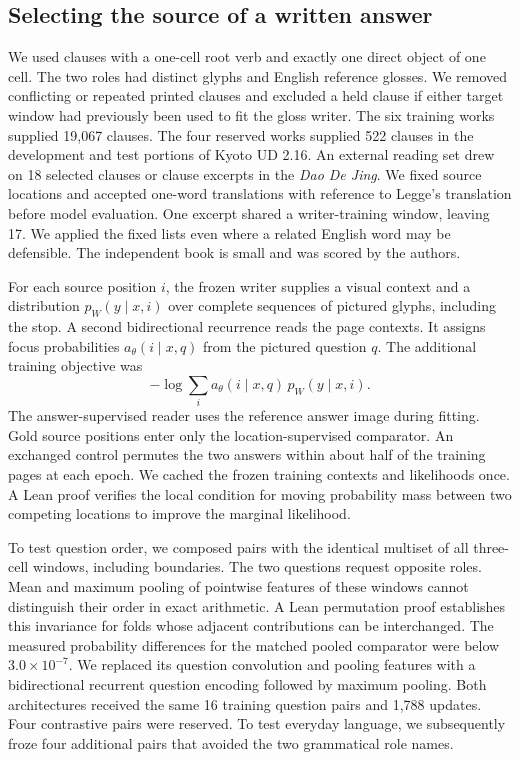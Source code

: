 \documentclass[12pt,a4paper]{article}
\providecommand{\DIFadd}[1]{{\protect\color{blue} \sf #1}} %
\begin{document}
\subsection*{\DIFadd{Selecting the source of a written answer}}
\DIFadd{We used clauses with a one-cell root verb and exactly one direct object of one cell. The two roles had distinct glyphs and English reference glosses. We removed conflicting or repeated printed clauses and excluded a held clause if either target window had previously been used to fit the gloss writer. The six training works supplied 19,067 clauses. The four reserved works supplied 522 clauses in the development and test portions of Kyoto UD 2.16. An external reading set drew on 18 selected clauses or clause excerpts in the \textit{Dao De Jing}. We fixed source locations and accepted one-word translations with reference to Legge's translation before model evaluation. One excerpt shared a writer-training window, leaving 17. We applied the fixed lists even where a related English word may be defensible. The independent book is small and was scored by the authors.
}

\DIFadd{For each source position $i$, the frozen writer supplies a visual context and a distribution $p_W(y\mid x,i)$ over complete sequences of pictured glyphs, including the stop. A second bidirectional recurrence reads the page contexts. It assigns focus probabilities $a_\theta(i\mid x,q)$ from the pictured question $q$. The additional training objective was
}\[
 -\log\sum_i a_\theta(i\mid x,q)\,p_W(y\mid x,i).
\]
\DIFadd{The answer-supervised reader uses the reference answer image during fitting. Gold source positions enter only the location-supervised comparator. An exchanged control permutes the two answers within about half of the training pages at each epoch. We cached the frozen training contexts and likelihoods once. A Lean proof verifies the local condition for moving probability mass between two competing locations to improve the marginal likelihood.
}

\DIFadd{To test question order, we composed pairs with the identical multiset of all three-cell windows, including boundaries. The two questions request opposite roles. Mean and maximum pooling of pointwise features of these windows cannot distinguish their order in exact arithmetic. A Lean permutation proof establishes this invariance for folds whose adjacent contributions can be interchanged. The measured probability differences for the matched pooled comparator were below $3.0\times10^{-7}$. We replaced its question convolution and pooling features with a bidirectional recurrent question encoding followed by maximum pooling. Both architectures received the same 16 training question pairs and 1,788 updates. Four contrastive pairs were reserved. To test everyday language, we subsequently froze four additional pairs that avoided the two grammatical role names.
}
\end{document}
